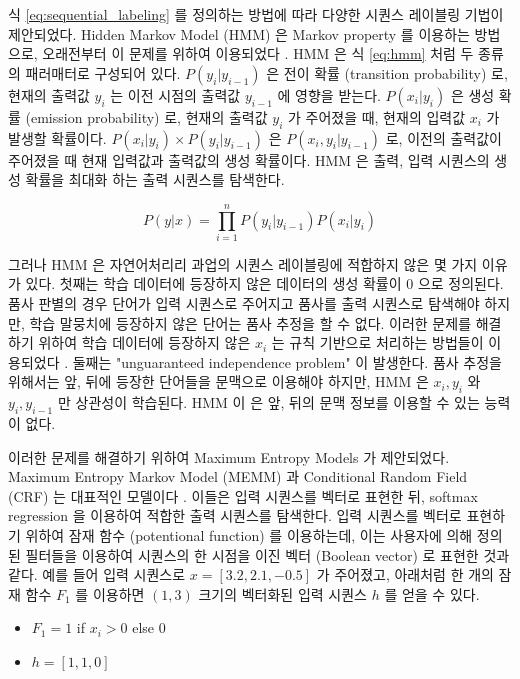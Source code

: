 \documentclass[11pt]{article}
\begin{document}
식 \ref{eq:sequential_labeling} 를 정의하는 방법에 따라 다양한 시퀀스 레이블링 기법이 제안되었다.
Hidden Markov Model (HMM) 은 Markov property 를 이용하는 방법으로, 오래전부터 이 문제를 위하여 이용되었다 \citep{krogh1994hidden}.
HMM 은 식 \ref{eq:hmm} 처럼 두 종류의 패러매터로 구성되어 있다.
$P(y_i \vert y_{i-1})$ 은 전이 확률 (transition probability) 로, 현재의 출력값 $y_i$ 는 이전 시점의 출력값 $y_{i-1}$ 에 영향을 받는다.
$P(x_i \vert y_i)$ 은 생성 확률 (emission probability) 로, 현재의 출력값 $y_i$ 가 주어졌을 때, 현재의 입력값 $x_i$ 가 발생할 확률이다.
$P(x_i \vert y_i) \times P(y_i \vert y_{i-1})$ 은 $P(x_i, y_i \vert y_{i-1})$ 로, 이전의 출력값이 주어졌을 때 현재 입력값과 출력값의 생성 확률이다.
HMM 은 출력, 입력 시퀀스의 생성 확률을 최대화 하는 출력 시퀀스를 탐색한다.

\begin{equation}
  \label{eq:hmm}
  P(y \vert x) = \prod_{i=1}^{n} P(y_i \vert y_{i-1}) P(x_i \vert y_i)
\end{equation}

그러나 HMM 은 자연어처리리 과업의 시퀀스 레이블링에 적합하지 않은 몇 가지 이유가 있다.
첫째는 학습 데이터에 등장하지 않은 데이터의 생성 확률이 0 으로 정의된다.
품사 판별의 경우 단어가 입력 시퀀스로 주어지고 품사를 출력 시퀀스로 탐색해야 하지만, 학습 말뭉치에 등장하지 않은 단어는 품사 추정을 할 수 없다.
이러한 문제를 해결하기 위하여 학습 데이터에 등장하지 않은 $x_i$ 는 규칙 기반으로 처리하는 방법들이 이용되었다 \citep{brants2000tnt}.
둘째는 "unguaranteed independence problem" 이 발생한다.
품사 추정을 위해서는 앞, 뒤에 등장한 단어들을 문맥으로 이용해야 하지만, HMM 은 $x_i, y_i$ 와 $y_i, y_{i-1}$ 만 상관성이 학습된다.
HMM 이 은 앞, 뒤의 문맥 정보를 이용할 수 있는 능력이 없다.

이러한 문제를 해결하기 위하여 Maximum Entropy Models 가 제안되었다.
Maximum Entropy Markov Model (MEMM) 과 Conditional Random Field (CRF) 는 대표적인 모델이다 \citep{mccallum2000maximum, lafferty2001conditional}.
이들은 입력 시퀀스를 벡터로 표현한 뒤, softmax regression 을 이용하여 적합한 출력 시퀀스를 탐색한다.
입력 시퀀스를 벡터로 표현하기 위하여 잠재 함수 (potentional function) 를 이용하는데, 이는 사용자에 의해 정의된 필터들을 이용하여 시퀀스의 한 시점을 이진 벡터 (Boolean vector) 로 표현한 것과 같다.
예를 들어 입력 시퀀스로 $x=[3.2, 2.1, -0.5]$ 가 주어졌고, 아래처럼 한 개의 잠재 함수 $F_1$ 를 이용하면 $(1, 3)$ 크기의 벡터화된 입력 시퀀스 $h$ 를 얻을 수 있다.

\begin{itemize}
  \item $F_1 = 1$ if $x_i > 0$ else $0$
  \item $h = [1, 1, 0]$
\end{itemize}
\end{document}
